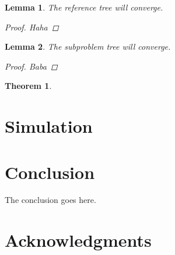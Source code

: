 \documentclass[conference]{IEEEtran}
\newtheorem{thm}{Theorem}
\newtheorem{lem}{Lemma}
\begin{document}
\begin{lem}
\label{lem:ref_tree:conv}
The reference tree will converge.
\begin{proof}
Haha
\end{proof}
\end{lem}

\begin{lem}
\label{lem:sub_tree:conv}
The subproblem tree will converge.
\begin{proof}
Baba
\end{proof}
\end{lem}

\begin{thm}
\label{thm:morrt:asym_opt}
\end{thm}

\section{Simulation}
\label{sec:simulation}


\section{Conclusion} 
\label{sec:conclusion}

The conclusion goes here.

\section*{Acknowledgments}




\end{document}
